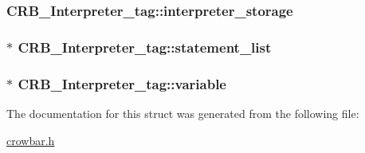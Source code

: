 \subsubsection[{interpreter\+\_\+storage}]{ C\+R\+B\+\_\+\+Interpreter\+\_\+tag\+::interpreter\+\_\+storage}\label{struct_c_r_b___interpreter__tag_a6959871398b2d3b1711e9f80a3e2dd4e}
\hypertarget{struct_c_r_b___interpreter__tag_a8d794cdb4f087bf09998f1979062b4f6}{}
\subsubsection[{statement\+\_\+list}]{$\ast$ C\+R\+B\+\_\+\+Interpreter\+\_\+tag\+::statement\+\_\+list}\label{struct_c_r_b___interpreter__tag_a8d794cdb4f087bf09998f1979062b4f6}
\hypertarget{struct_c_r_b___interpreter__tag_a9226949153a3c16dbd27830598997930}{}
\subsubsection[{variable}]{$\ast$ C\+R\+B\+\_\+\+Interpreter\+\_\+tag\+::variable}\label{struct_c_r_b___interpreter__tag_a9226949153a3c16dbd27830598997930}


The documentation for this struct was generated from the following file\+:\begin{DoxyCompactItemize}
\item 
\hyperlink{crowbar_8h}{crowbar.\+h}\end{DoxyCompactItemize}
